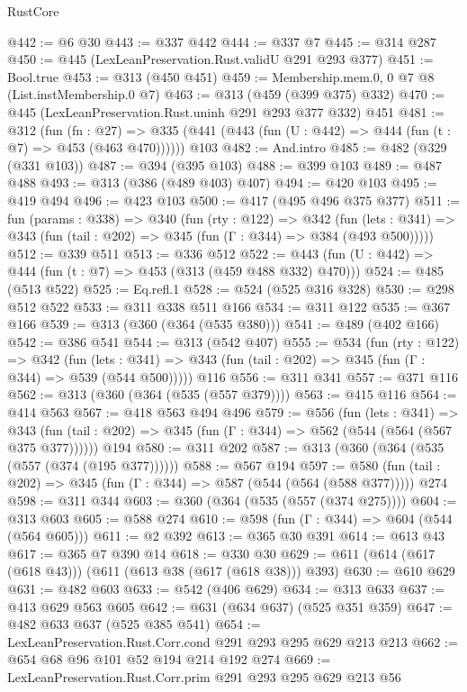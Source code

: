 \begin{lexlean}{RustCore}
\begin{coremodule}
@442 := @6 @30
@443 := @337 @442
@444 := @337 @7
@445 := @314 @287
@450 := @445 (LexLeanPreservation.Rust.validU @291 @293 @377)
@451 := Bool.true
@453 := @313 (@450 @451)
@459 := Membership.mem.{0, 0} @7 @8 (List.instMembership.{0} @7)
@463 := @313 (@459 (@399 @375) @332)
@470 := @445 (LexLeanPreservation.Rust.uninh @291 @293 @377 @332) @451
@481 := @312
    (fun (fn : @27) =>
    @335 (@441 (@443 (fun (U : @442) => @444 (fun (t : @7) => @453 (@463 @470))))))
    @103
@482 := And.intro
@485 := @482 (@329 (@331 @103))
@487 := @394 (@395 @103)
@488 := @399 @103
@489 := @487 @488
@493 := @313 (@386 (@489 @403) @407)
@494 := @420 @103
@495 := @419 @494
@496 := @423 @103
@500 := @417 (@495 @496 @375 @377)
@511 := fun (params : @338) =>
  @340
    (fun (rty : @122) =>
    @342
      (fun (lets : @341) => @343 (fun (tail : @202) => @345 (fun (Γ : @344) => @384 (@493 @500)))))
@512 := @339 @511
@513 := @336 @512
@522 := @443 (fun (U : @442) => @444 (fun (t : @7) => @453 (@313 (@459 @488 @332) @470)))
@524 := @485 (@513 @522)
@525 := Eq.refl.{1}
@528 := @524 (@525 @316 @328)
@530 := @298 @512 @522
@533 := @311 @338 @511 @166
@534 := @311 @122
@535 := @367 @166
@539 := @313 (@360 (@364 (@535 @380)))
@541 := @489 (@402 @166)
@542 := @386 @541
@544 := @313 (@542 @407)
@555 := @534
    (fun (rty : @122) =>
    @342
      (fun (lets : @341) => @343 (fun (tail : @202) => @345 (fun (Γ : @344) => @539 (@544 @500)))))
    @116
@556 := @311 @341
@557 := @371 @116
@562 := @313 (@360 (@364 (@535 (@557 @379))))
@563 := @415 @116
@564 := @414 @563
@567 := @418 @563 @494 @496
@579 := @556
    (fun (lets : @341) =>
    @343 (fun (tail : @202) => @345 (fun (Γ : @344) => @562 (@544 (@564 (@567 @375 @377))))))
    @194
@580 := @311 @202
@587 := @313 (@360 (@364 (@535 (@557 (@374 (@195 @377))))))
@588 := @567 @194
@597 := @580 (fun (tail : @202) => @345 (fun (Γ : @344) => @587 (@544 (@564 (@588 @377))))) @274
@598 := @311 @344
@603 := @360 (@364 (@535 (@557 (@374 @275))))
@604 := @313 @603
@605 := @588 @274
@610 := @598 (fun (Γ : @344) => @604 (@544 (@564 @605)))
@611 := @2 @392
@613 := @365 @30 @391
@614 := @613 @43
@617 := @365 @7 @390 @14
@618 := @330 @30
@629 := @611 (@614 (@617 (@618 @43))) (@611 (@613 @38 (@617 (@618 @38))) @393)
@630 := @610 @629
@631 := @482 @603
@633 := @542 (@406 @629)
@634 := @313 @633
@637 := @413 @629 @563 @605
@642 := @631 (@634 @637) (@525 @351 @359)
@647 := @482 @633 @637 (@525 @385 @541)
@654 := LexLeanPreservation.Rust.Corr.cond @291 @293 @295 @629 @213 @213
@662 := @654 @68 @96 @101 @52 @194 @214 @192 @274
@669 := LexLeanPreservation.Rust.Corr.prim @291 @293 @295 @629 @213 @56

\end{coremodule}
\end{lexlean}
